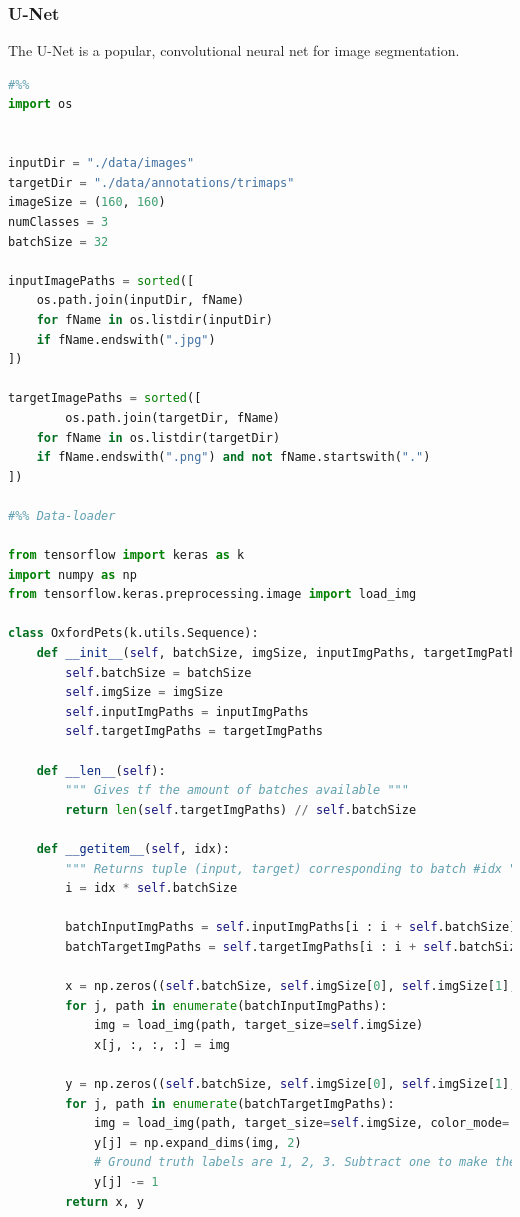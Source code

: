 \subsubsection{U-Net}
The U-Net is a popular, convolutional neural net for image segmentation.
\begin{lstlisting}[language=python]
#%%
import os


inputDir = "./data/images"
targetDir = "./data/annotations/trimaps"
imageSize = (160, 160)
numClasses = 3
batchSize = 32

inputImagePaths = sorted([
    os.path.join(inputDir, fName)
    for fName in os.listdir(inputDir)
    if fName.endswith(".jpg")
])

targetImagePaths = sorted([
        os.path.join(targetDir, fName)
    for fName in os.listdir(targetDir)
    if fName.endswith(".png") and not fName.startswith(".")
])

#%% Data-loader

from tensorflow import keras as k
import numpy as np
from tensorflow.keras.preprocessing.image import load_img

class OxfordPets(k.utils.Sequence):
    def __init__(self, batchSize, imgSize, inputImgPaths, targetImgPaths):
        self.batchSize = batchSize
        self.imgSize = imgSize
        self.inputImgPaths = inputImgPaths
        self.targetImgPaths = targetImgPaths

    def __len__(self):
        """ Gives tf the amount of batches available """
        return len(self.targetImgPaths) // self.batchSize

    def __getitem__(self, idx):
        """ Returns tuple (input, target) corresponding to batch #idx """
        i = idx * self.batchSize
        
        batchInputImgPaths = self.inputImgPaths[i : i + self.batchSize]
        batchTargetImgPaths = self.targetImgPaths[i : i + self.batchSize]
        
        x = np.zeros((self.batchSize, self.imgSize[0], self.imgSize[1], 3), dtype='float32')
        for j, path in enumerate(batchInputImgPaths):
            img = load_img(path, target_size=self.imgSize)
            x[j, :, :, :] = img
        
        y = np.zeros((self.batchSize, self.imgSize[0], self.imgSize[1], 1), dtype='uint8')
        for j, path in enumerate(batchTargetImgPaths):
            img = load_img(path, target_size=self.imgSize, color_mode='grayscale')
            y[j] = np.expand_dims(img, 2)
            # Ground truth labels are 1, 2, 3. Subtract one to make them 0, 1, 2:
            y[j] -= 1
        return x, y


\end{lstlisting}
